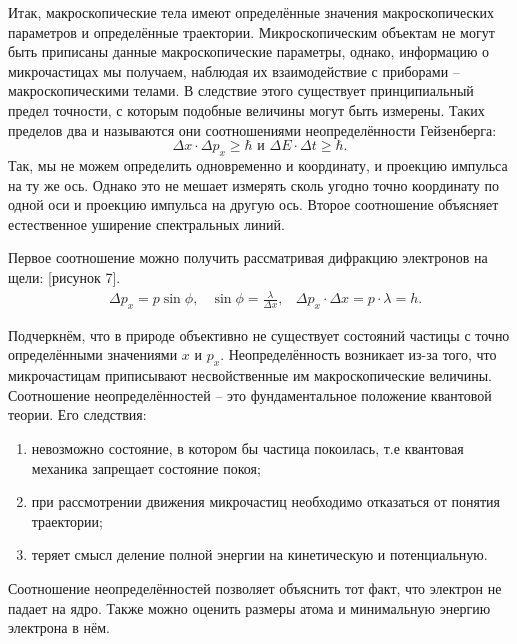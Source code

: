 Итак, макроскопические тела имеют определённые значения макроскопических
параметров и определённые траектории. Микроскопическим объектам не могут быть
приписаны данные макроскопические параметры, однако, информацию о микрочастицах
мы получаем, наблюдая их взаимодействие с приборами -- макроскопическими телами.
В следствие этого существует принципиальный предел точности, с которым подобные
величины могут быть измерены. Таких пределов два и называются они соотношениями
неопределённости Гейзенберга:
\[
    \Delta x \cdot \Delta p_x \ge \hbar \text{ и }
    \Delta E \cdot \Delta t \ge \hbar.
\]
Так, мы не можем определить одновременно и координату, и проекцию импульса на ту
же ось. Однако это не мешает измерять сколь угодно точно координату по одной оси
и проекцию импульса на другую ось. Второе соотношение объясняет естественное
уширение спектральных линий.

Первое соотношение можно получить рассматривая дифракцию электронов на щели:
[рисунок 7].
\begin{align*}
    & \Delta p_x = p \sin\phi,
    & \sin\phi = \frac{\lambda}{\Delta x},
    & \Delta p_x \cdot \Delta x = p \cdot \lambda = h.
\end{align*}

Подчеркнём, что в природе объективно не существует состояний частицы с точно
определёнными значениями \( x \) и \( p_x \). Неопределённость возникает из-за
того, что микрочастицам приписывают несвойственные им макроскопические величины.
Соотношение неопределённостей -- это фундаментальное положение квантовой теории.
Его следствия:
\begin{enumerate}
    \item невозможно состояние, в котором бы частица покоилась, т.е квантовая
        механика запрещает состояние покоя;
    \item при рассмотрении движения микрочастиц необходимо отказаться от
        понятия траектории;
    \item теряет смысл деление полной энергии на кинетическую и потенциальную.
\end{enumerate}

Соотношение неопределённостей позволяет объяснить тот факт, что электрон
не падает на ядро. Также можно оценить размеры атома и минимальную энергию
электрона в нём.

\newpage
